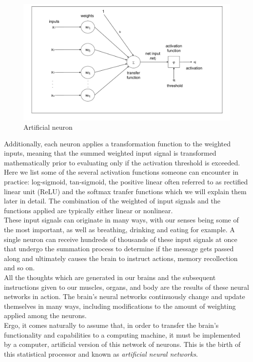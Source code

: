 \begin{figure}[h!]
\includegraphics[width=15cm,center,keepaspectratio]{figures/artificial_neuron}
\caption{Artificial neuron}
\label{fig:artificial_neuron}
\end{figure}
Additionally, each neuron applies a transformation function to the weighted inputs, meaning that the summed weighted input signal is transformed mathematically prior to evaluating only if the activation threshold is exceeded. Here we list some of the several activation functions someone can encounter in practice: log-sigmoid, tan-sigmoid, the positive linear often referred to as rectified linear unit (ReLU) and the softmax tranfer functions which we will explain them later in detail. The combination of the weighted of input signals and the functions applied are typically either linear or nonlinear.\\
These input signals can originate in many ways, with our senses being some of the most important, as well as breathing, drinking and eating for example. A single neuron can receive hundreds of thousands of these input signals at once that undergo the summation process to determine if the message gets passed along and ultimately causes the brain to instruct actions, memory recollection and so on.\\
All the thoughts which are generated in our brains and the subsequent instructions given to our muscles, organs, and body are the results of these neural networks in action. The brain's neural networks continuously change and update themselves in many ways, including modifications to the amount of weighting applied among the neurons.\\
Ergo, it comes naturally to assume that, in order to transfer the brain's functionality and capabilities to  a computing machine, it must be implemented by a computer, artificial version of this network of neurons. This is the birth of this statistical processor and  known as \textit{artificial neural networks}. \\

